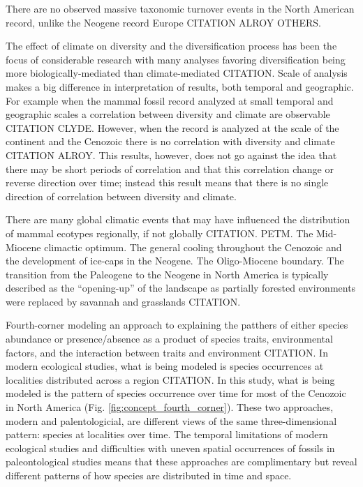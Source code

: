 \documentclass[12pt,letterpaper]{article}
\begin{document}
There are no observed massive taxonomic turnover events in the North American record, unlike the Neogene record Europe CITATION ALROY OTHERS.

The effect of climate on diversity and the diversification process has been the focus of considerable research with many analyses favoring diversification being more biologically-mediated than climate-mediated CITATION. Scale of analysis makes a big difference in interpretation of results, both temporal and geographic. For example when the mammal fossil record analyzed at small temporal and geographic scales a correlation between diversity and climate are observable CITATION CLYDE. However, when the record is analyzed at the scale of the continent and the Cenozoic there is no correlation with diversity and climate CITATION ALROY. This results, however, does not go against the idea that there may be short periods of correlation and that this correlation change or reverse direction over time; instead this result means that there is no single direction of correlation between diversity and climate.

There are many global climatic events that may have influenced the distribution of mammal ecotypes regionally, if not globally CITATION. PETM. The Mid-Miocene climactic optimum. The general cooling throughout the Cenozoic and the development of ice-caps in the Neogene. The Oligo-Miocene boundary. The transition from the Paleogene to the Neogene in North America is typically described as the ``opening-up'' of the landscape as partially forested environments were replaced by savannah and grasslands CITATION.




Fourth-corner modeling an approach to explaining the patthers of either species abundance or presence/absence as a product of species traits, environmental factors, and the interaction between traits and environment CITATION. In modern ecological studies, what is being modeled is species occurrences at localities distributed across a region CITATION. In this study, what is being modeled is the pattern of species occurrence over time for most of the Cenozoic in North America (Fig. \ref{fig:concept_fourth_corner}). These two approaches, modern and palentologicial, are different views of the same three-dimensional pattern: species at localities over time. The temporal limitations of modern ecological studies and difficulties with uneven spatial occurrences of fossils in paleontological studies means that these approaches are complimentary but reveal different patterns of how species are distributed in time and space.
\end{document}
